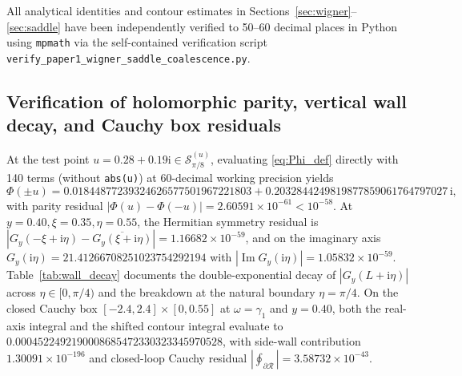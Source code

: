 \documentclass[11pt,a4paper,reqno]{amsart}
\theoremstyle{definition}
\theoremstyle{remark}
\numberwithin{equation}{section}
\newcommand{\ii}{\mathrm{i}}
\newcommand{\Ima}{\operatorname{Im}}
\begin{document}
All analytical identities and contour estimates in Sections~\ref{sec:wigner}--\ref{sec:saddle} have been independently verified to 50--60 decimal places in Python using \texttt{mpmath} via the self-contained verification script \nolinkurl{verify_paper1_wigner_saddle_coalescence.py}.

\subsection{Verification of holomorphic parity, vertical wall decay, and Cauchy box residuals}\label{subsec:num_walls}

At the test point $u = 0.28 + 0.19\ii \in \mathcal{S}_{\pi/8}^{(u)}$, evaluating \eqref{eq:Phi_def} directly with 140 terms (without \texttt{abs(u)}) at 60-decimal working precision yields
\[
\Phi(\pm u) = 0.01844877239324626577501967221803 + 0.2032844249819877859061764797027\,\ii,
\]
with parity residual $|\Phi(u) - \Phi(-u)| = 2.60591 \times 10^{-61} < 10^{-58}$. At $y = 0.40, \xi = 0.35, \eta = 0.55$, the Hermitian symmetry residual is $|G_y(-\xi+\ii\eta) - \overline{G_y(\xi+\ii\eta)}| = 1.16682 \times 10^{-59}$, and on the imaginary axis $G_y(\ii\eta) = 21.41266708251023754292194$ with $|\Ima G_y(\ii\eta)| = 1.05832 \times 10^{-59}$. Table~\ref{tab:wall_decay} documents the double-exponential decay of $|G_y(L+\ii\eta)|$ across $\eta \in [0,\pi/4)$ and the breakdown at the natural boundary $\eta = \pi/4$. On the closed Cauchy box $[-2.4, 2.4] \times [0, 0.55]$ at $\omega = \gamma_1$ and $y = 0.40$, both the real-axis integral and the shifted contour integral evaluate to $0.0004522492190008685472330323345970528$, with side-wall contribution $1.30091 \times 10^{-196}$ and closed-loop Cauchy residual $|\oint_{\partial\mathcal{R}}| = 3.58732 \times 10^{-43}$.
\end{document}
